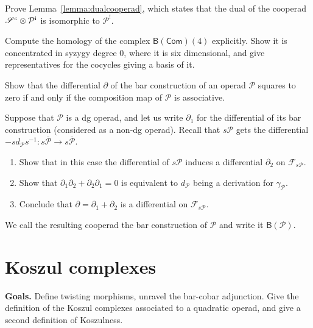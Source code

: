 \documentclass[fleqn, a4paper, twoside]{article}
\newcommand{\antishriek}{\text{\raisebox{\depth}{\textexclamdown}}}
\newcommand{\0}{\langle 0\rangle}
\newcommand{\FF}{\mathcal{F}}
\newcommand{\B}[1]{\mathsf{B}(#1)}
\newenvironment{tenumerate}{
 \begin{enumerate}
  \setlength{\itemsep}{0pt}
  \setlength{\parskip}{0pt}
}{\end{enumerate}}
\DeclareRobustCommand{\[}{\begin{equation}}%
\DeclareRobustCommand{\]}{\end{equation}}%
\theoremstyle{mytheorem}
\theoremstyle{introthm}
\theoremstyle{mydefinition}
\theoremstyle{mydefinition2}
\theoremstyle{plain} %
\newcommand{\Com}{\mathsf{Com}}
\newcommand{\?}{\,?\,}
\newcommand{\PP}{{\mathcal{P}}}
\theoremstyle{mytheorem}
\theoremstyle{plain} %
\newcommand\blankpage{%
    \null
    \thispagestyle{empty}%
    \newpage}
\begin{document}
\begin{question}\label{ex:dualcooperad}
Prove Lemma~\ref{lemma:dualcooperad}, which states
that the dual of the cooperad  $\sus^c\otimes \PP^{\antishriek}$
is isomorphic to $\PP^!$.
\end{question} 

\begin{question}\label{ex:barcom}
Compute the homology of the complex $\B{\Com}(4)$ explicitly.
Show it is concentrated in syzygy degree $0$, where it is
six dimensional, and give representatives for the 
cocycles giving a basis of it.
\end{question}

\begin{question}\label{ex:zerosquare}
Show that the differential $\partial$ of the bar construction of
an operad $\PP$ squares to zero if and only if the composition
map of $\PP$ is associative. 
\end{question}

\begin{question}\label{ex:dgbar} Suppose that $\PP$ is a dg
operad, and let us write $\partial_1$ for the differential of its
bar construction (considered as a non-dg operad). Recall
that $s\PP$ gets the differential $-s d_\PP s^{-1}: 
s\overline{\PP}\longrightarrow s\overline{\PP}$.

\begin{tenumerate}
\item Show that in this case the differential
of $s\PP$ induces a differential $\partial_2$ on $\FF_{s\PP}$. 
\item Show that $\partial_1\partial_2 + \partial_2\partial_1=0$
is equivalent to $d_\PP$ being a derivation for $\gamma_\PP$.
\item
Conclude that $\partial = \partial_1 + \partial_2$ is a differential
on $\FF_{s\PP}$. 
\end{tenumerate}
We call the resulting cooperad the bar construction of
$\PP$ and write it $\B{\PP}$.
\end{question}


 
\afterpage{\blankpage}
\newpage
\section{Koszul complexes}\label{lecture:KD2}

\textbf{Goals.} Define twisting morphisms, unravel the
bar-cobar adjunction. Give the definition of the
Koszul complexes associated to a quadratic operad,
and give a second definition of Koszulness.
\end{document}
